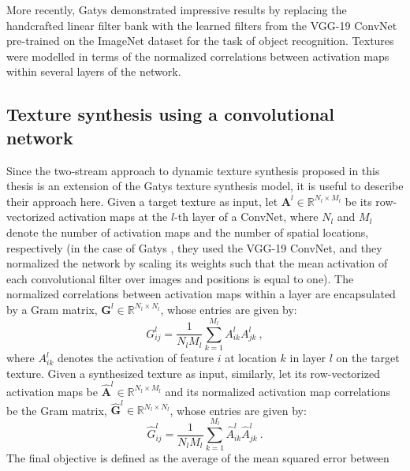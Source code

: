 More recently, Gatys \etal \cite{gatys2015} demonstrated
impressive results by replacing the handcrafted linear filter bank with the learned filters from the VGG-19
\cite{simonyan2014very} ConvNet pre-trained on the ImageNet \cite{russakovsky2015} dataset for the task of object
recognition. 
Textures were modelled in terms of the normalized correlations between activation maps within several layers of the network.

\subsection{Texture synthesis using a convolutional network}
\label{sec:texture_synthesis_using_a_convnet}

Since the two-stream approach to dynamic texture synthesis proposed in this thesis is an extension of the Gatys \etal \cite{gatys2015} texture 
synthesis model, it is useful to describe their approach here. Given a target texture as input,
let $\mathbf{A}^{l} \in \mathbb{R}^{N_l\times M_l}$
be its row-vectorized activation maps at the $l$-th layer of a ConvNet, where $N_l$ and $M_l$ denote the number of
activation maps and the number of spatial locations,
respectively (in the case of Gatys \etal \cite{gatys2015}, they used the VGG-19 ConvNet, and they normalized the network by scaling its weights such that the mean activation of each convolutional filter over images and positions is equal to one).
The normalized correlations between activation maps
within a layer are encapsulated by a Gram matrix,
$\mathbf{G}^l \in \mathbb{R}^{N_l \times N_l}$, whose entries are given by:
\begin{equation}
	G_{ij}^l = \frac{1}{N_l M_l} \sum_{k=1}^{M_l} A_{ik}^l A_{jk}^l\ ,
\end{equation}
where $A_{ik}^l$ denotes the activation of feature $i$ at
location $k$ in layer $l$ on the target texture.
Given a synthesized texture as input, similarly, let its row-vectorized activation maps
be $\hat{\mathbf{A}}^{l} \in \mathbb{R}^{N_l\times M_l}$ and its normalized
activation map correlations be the Gram matrix, $\hat{\mathbf{G}}^l \in \mathbb{R}^{N_l \times N_l}$, whose entries are given by:
\begin{equation}
	\hat{G}_{ij}^l = \frac{1}{N_l M_l} \sum_{k=1}^{M_l} \hat{A}_{ik}^l \hat{A}_{jk}^l\ .
\end{equation}
The final objective is defined as the average of the mean squared error between
